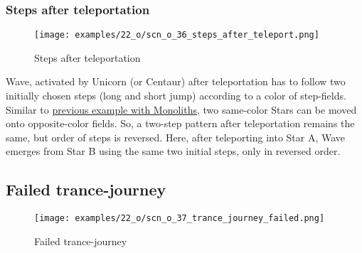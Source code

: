 \clearpage %

\subsubsection*{Steps after teleportation}
\label{sec:One/Starchild/Activating Wave/Steps after teleportation}

\vspace*{-1.5\baselineskip}
\noindent
\begin{figure}[!h]
\texttt{[image: examples/22\_o/scn\_o\_36\_steps\_after\_teleport.png]}
\vspace*{-1.4\baselineskip}
\caption{Steps after teleportation}
\label{fig:scn_o_36_steps_after_teleport}
\end{figure}

\vspace*{-0.5\baselineskip}
Wave, activated by Unicorn (or Centaur) after teleportation has to follow two initially
chosen steps (long and short jump) according to a color of step-fields. Similar to
\hyperref[fig:scn_d_19_steps_after_teleport_init]{previous example with Monoliths},
two same-color Stars can be moved onto opposite-color fields. So, a two-step pattern
after teleportation remains the same, but order of steps is reversed. Here, after
teleporting into Star A, Wave emerges from Star B using the same two initial steps,
only in reversed order.

\clearpage %

\subsection*{Failed trance-journey}
\label{sec:One/Starchild/Failed trance-journey}

\vspace*{-1.5\baselineskip}
\noindent
\begin{figure}[!h]
\texttt{[image: examples/22\_o/scn\_o\_37\_trance\_journey\_failed.png]}
\vspace*{-1.4\baselineskip}
\caption{Failed trance-journey}
\label{fig:scn_o_37_trance_journey_failed}
\end{figure}


